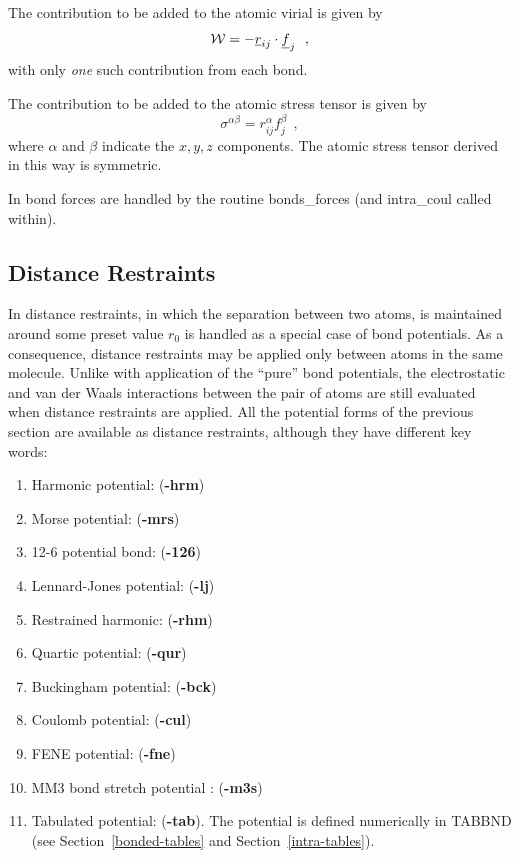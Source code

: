The contribution to be added to the atomic virial is given by
\begin{equation}
{\cal W} = -\mbox{$\underline{r}$}_{ij} \cdot \mbox{$\underline{f}$}_{j}~~,
\end{equation}
with only {\em one} such contribution from each bond.

The contribution to be added to the atomic stress
tensor is given by
\begin{equation}
\sigma^{\alpha \beta} = r_{ij}^{\alpha} f_{j}^{\beta}~~, \label{bonds}
\end{equation}
where $\alpha$ and $\beta$ indicate the $x,y,z$ components.  The
atomic stress tensor derived in this way is
symmetric.

In \D bond forces are handled by the routine {\sc bonds\_forces}
(and {\sc intra\_coul} called within).

\subsection{Distance Restraints}

In \D distance restraints, in which the separation between two
atoms, is maintained around some preset value $r_0$ is handled as
a special case of bond potentials.  As a consequence, distance
restraints may be applied only between atoms in the same molecule.
Unlike with application of the ``pure'' bond
potentials, the
electrostatic and van der
Waals interactions between the pair
of atoms are still evaluated when distance restraints are applied.
All the potential forms of the previous section are available as
distance restraints, although they have
different key words:

\begin{enumerate}
\item Harmonic potential:  ({\bf -hrm})
\item Morse potential:  ({\bf -mrs})
\item 12-6 potential bond:  ({\bf -126})
\item Lennard-Jones potential:  ({\bf -lj})
\item Restrained harmonic:  ({\bf -rhm})
\item Quartic potential:  ({\bf -qur})
\item Buckingham potential:  ({\bf -bck})
\item Coulomb potential:  ({\bf -cul})
\item FENE potential:  ({\bf -fne})
\item MM3 bond stretch potential \cite{allinger-89a}:  ({\bf -m3s})
\item Tabulated potential:  ({\bf -tab}).  The potential is defined numerically in TABBND (see Section~\ref{bonded-tables} and Section~\ref{intra-tables}).
\end{enumerate}

